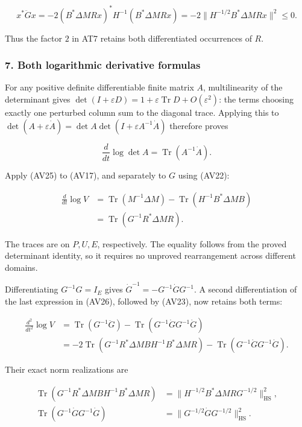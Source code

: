 \[
x^*\ddot Gx
=-2(B^*\Delta M Rx)^*H^{-1}(B^*\Delta M Rx)
=-2\|H^{-1/2}B^*\Delta M Rx\|^2\le0.
\tag{AV24}
\]

Thus the factor \(2\) in AT7 retains both differentiated occurrences of \(R\).

\subsubsection{7. Both logarithmic derivative formulas}\label{endpoint-variation_review--both-logarithmic-derivative-formulas}

For any positive definite differentiable finite matrix \(A\), multilinearity of the determinant gives \(\det(I+\varepsilon D)=1+\varepsilon\operatorname{Tr}D+O(\varepsilon^2)\): the terms choosing exactly one perturbed column sum to the diagonal trace. Applying this to \(\det(A+\varepsilon\dot A)=\det A\det(I+\varepsilon A^{-1}\dot A)\) therefore proves

\[
\frac{d}{dt}\log\det A=\operatorname{Tr}(A^{-1}\dot A).
\tag{AV25}
\]

Apply (AV25) to (AV17), and separately to \(G\) using (AV22):

\[
\begin{aligned}
\frac{d}{dt}\log V
&=\operatorname{Tr}(M^{-1}\Delta M)
-\operatorname{Tr}(H^{-1}B^*\Delta M B)\\
&=\operatorname{Tr}(G^{-1}R^*\Delta M R).
\end{aligned}
\tag{AV26}
\]

The traces are on \(P,U,E\), respectively. The equality follows from the proved determinant identity, so it requires no unproved rearrangement across different domains.

Differentiating \(G^{-1}G=I_E\) gives \(\dot G^{-1}=-G^{-1}\dot G G^{-1}\). A second differentiation of the last expression in (AV26), followed by (AV23), now retains both terms:

\[
\begin{aligned}
\frac{d^2}{dt^2}\log V
&=\operatorname{Tr}(G^{-1}\ddot G)
-\operatorname{Tr}(G^{-1}\dot G G^{-1}\dot G)\\
&=-2\operatorname{Tr}(G^{-1}R^*\Delta M BH^{-1}B^*\Delta M R)
-\operatorname{Tr}(G^{-1}\dot G G^{-1}\dot G).
\end{aligned}
\tag{AV27}
\]

Their exact norm realizations are

\[
\begin{aligned}
\operatorname{Tr}(G^{-1}R^*\Delta M BH^{-1}B^*\Delta M R)
&=\|H^{-1/2}B^*\Delta M RG^{-1/2}\|_{\mathrm{HS}}^2,\\
\operatorname{Tr}(G^{-1}\dot G G^{-1}\dot G)
&=\|G^{-1/2}\dot G G^{-1/2}\|_{\mathrm{HS}}^2.
\end{aligned}
\tag{AV28}
\]

